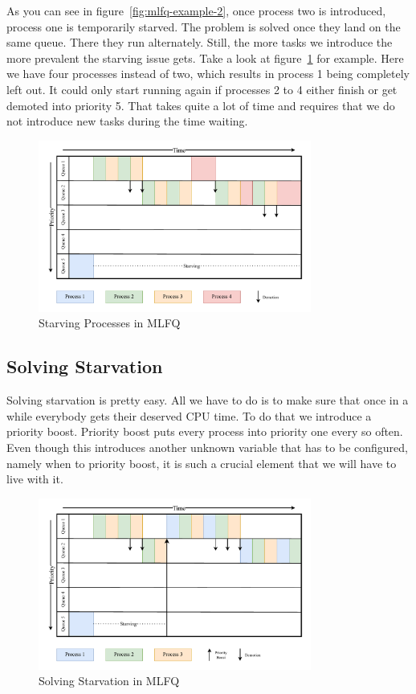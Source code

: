 As you can see in figure~\ref{fig:mlfq-example-2}, once process two is introduced, process one is temporarily starved. The problem is solved once they land on the same queue.
There they run alternately.
Still, the more tasks we introduce the more prevalent the starving issue gets.
Take a look at figure~\ref{fig:mlfq-example-3} for example.
Here we have four processes instead of two, which results in process 1 being completely left out.
It could only start running again if processes 2 to 4 either finish or get demoted into priority 5.
That takes quite a lot of time and requires that we do not introduce new tasks during the time waiting.

\begin{figure}[h]
    \centering
    \includegraphics[width=0.8\textwidth]{Assets/MLFQ-Example-3.pdf}
    \caption{Starving Processes in MLFQ}
    \label{fig:mlfq-example-3}
\end{figure}

\subsection{Solving Starvation}

Solving starvation is pretty easy.
All we have to do is to make sure that once in a while everybody gets their deserved CPU time.
To do that we introduce a priority boost. Priority boost puts every process into priority one every so often.
Even though this introduces another unknown variable that has to be configured, namely when to priority boost, it is such a crucial element that we will have to live with it.

\begin{figure}[h]
    \centering
    \includegraphics[width=0.8\textwidth]{Assets/MLFQ-Example-4.pdf}
    \caption{Solving Starvation in MLFQ}
    \label{fig:mlfq-example-4}
\end{figure}

